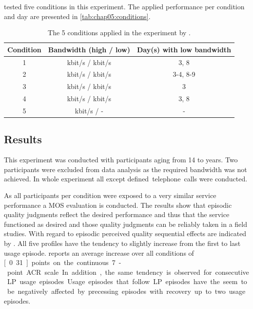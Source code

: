 \cite{moller_single-call_2011} tested five conditions in this experiment.
The applied performance per condition and day are presented in \autoref{tab:chap05:conditions}.

\begin{table}[h]
	\centering
	\begin{tabular}{|c||c|c|}
	Condition & Bandwidth (high / low) & Day(s) with low bandwidth \\
	\hline
	1 & \unit[500]{kbit/s} / \unit[32]{kbit/s} & 3, 8 \\
	2 & \unit[500]{kbit/s} / \unit[32]{kbit/s} & 3-4, 8-9 \\
	3 & \unit[500]{kbit/s} / \unit[32]{kbit/s} & 3 \\
	4 & \unit[150]{kbit/s} / \unit[32]{kbit/s} & 3, 8 \\
	5 & \unit[500]{kbit/s} / - & - \\
	\hline
	\end{tabular}
	\caption{The 5 conditions applied in the experiment by \cite{moller_single-call_2011}.}
	\label{tab:chap05:conditions}
\end{table}

\subsection{Results}
This experiment was conducted with \unit[58]{participants} aging from 14 to \unit[64]{years}.%
Two participants were excluded from data analysis as the required bandwidth was not achieved.
In whole experiment all except \unit[6]{defined telephone calls} were conducted.

As all participants per condition were exposed to a very similar service performance a \ac{MOS} evaluation is conducted.
The results show that episodic quality judgments reflect the desired performance and thus that the service functioned as desired and those quality judgments can be reliably taken in a field studies.
With regard to episodic perceived quality sequential effects are indicated by \cite{moller_single-call_2011}.
All five profiles have the tendency to slightly increase from the first to last usage episode.
\cite{moller_single-call_2011} reports an average increase over all conditions of \unit[0.31]{points} on the continuous 7-point \ac{ACR} scale.
In addition, the same tendency is observed for consecutive \ac{LP} usage episodes.
Usage episodes that follow \ac{LP} episodes have the seem to be negatively affected by precessing  episodes with recovery up to two usage episodes.

